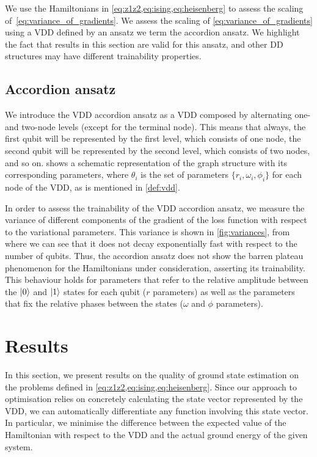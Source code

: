 \documentclass{ieeeaccess}
\begin{document}
We use the Hamiltonians in \cref{eq:z1z2,eq:ising,eq:heisenberg} to assess the scaling of~\cref{eq:variance_of_gradients}.
We assess the scaling of \cref{eq:variance_of_gradients} using a VDD defined by an ansatz we term the accordion ansatz.
We highlight the fact that results in this section are valid for this ansatz, and other DD structures may have different trainability properties.



\subsection{Accordion ansatz}
We introduce the VDD accordion ansatz as a VDD composed by alternating one- and two-node levels (except for the terminal node).
This means that always, the first qubit will be represented by the first level, which consists of one node, the second qubit will be represented by the second level, which consists of two nodes, and so on.
 shows a schematic representation of the graph structure with its corresponding parameters, where $\theta_i$ is the set of parameters $\{r_i,\omega_i,\phi_i\}$ for each node of the VDD, as is mentioned in \cref{def:vdd}.




In order to assess the trainability of the VDD accordion ansatz, we measure the variance of different components of the gradient of the loss function with respect to the variational parameters.
This variance is shown in \cref{fig:variances}, from where we can see that it does not decay exponentially fast with respect to the number of qubits.
Thus, the accordion ansatz does not show the barren plateau phenomenon for the Hamiltonians under consideration, asserting its trainability.
This behaviour holds for parameters that refer to the relative amplitude between the $\ket{0}$ and $\ket{1}$ states for each qubit ($r$ parameters) as well as the parameters that fix the relative phases between the states ($\omega$ and $\phi$ parameters).



\section{Results}\label{sec:results}
In this section, we present results on the quality of ground state estimation on the problems defined in \cref{eq:z1z2,eq:ising,eq:heisenberg}. Since our approach to optimisation relies on concretely calculating the state vector represented by the VDD, we can automatically differentiate any function involving this state vector. In particular, we minimise the difference between the expected value of the Hamiltonian with respect to the VDD and the actual ground energy of the given system. 
\end{document}

